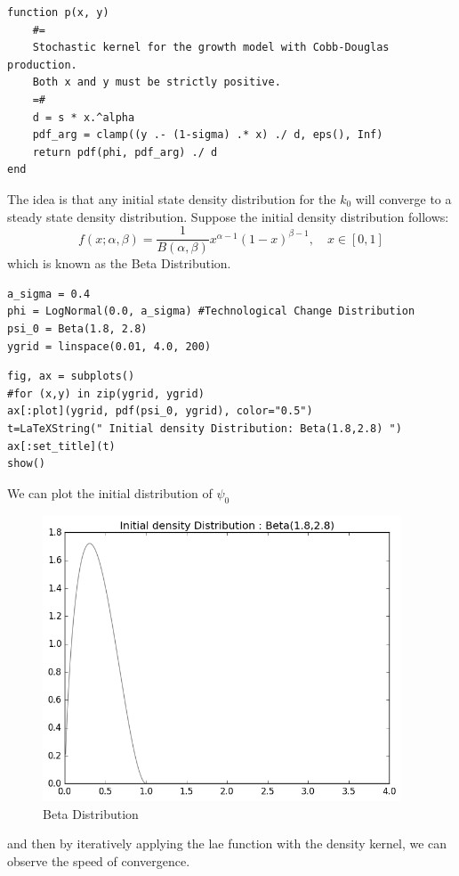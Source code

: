 \documentclass[a4paper,12pt]{article}
\theoremstyle{definition}
\begin{document}
\begin{lstlisting}
function p(x, y)
    #=
    Stochastic kernel for the growth model with Cobb-Douglas production.
    Both x and y must be strictly positive.
    =#
    d = s * x.^alpha
    pdf_arg = clamp((y .- (1-sigma) .* x) ./ d, eps(), Inf) 
    return pdf(phi, pdf_arg) ./ d
end
\end{lstlisting}

The idea is that any initial state density distribution for the $k_0$ will converge to a steady state density distribution. 
Suppose the initial density distribution follows:
\begin{equation}
f(x; \alpha, \beta) = \frac{1}{B(\alpha, \beta)}
 x^{\alpha - 1} (1 - x)^{\beta - 1}, \quad x \in [0, 1]
\end{equation}
which is known as the Beta Distribution. 

\begin{lstlisting}
a_sigma = 0.4
phi = LogNormal(0.0, a_sigma) #Technological Change Distribution
psi_0 = Beta(1.8, 2.8) 
ygrid = linspace(0.01, 4.0, 200)
\end{lstlisting}

\begin{lstlisting}
fig, ax = subplots()
#for (x,y) in zip(ygrid, ygrid)
ax[:plot](ygrid, pdf(psi_0, ygrid), color="0.5")
t=LaTeXString(" Initial density Distribution: Beta(1.8,2.8) ")
ax[:set_title](t)
show()
\end{lstlisting}

We can plot the initial distribution of $\psi_0$
\begin{figure}[h]
\caption{Beta Distribution}
\label{fig:BD}
\includegraphics[width=0.95\textwidth]{BetaDistribution.png} 
\centering
\end{figure}
and then by iteratively applying the lae function with the density kernel, we can observe the speed of convergence.
\end{document}
